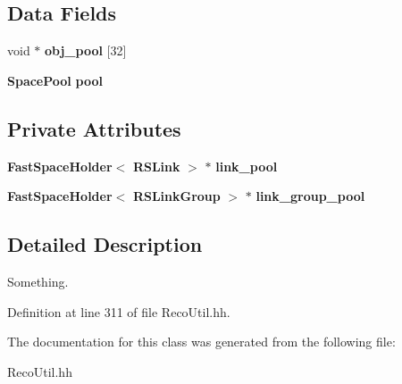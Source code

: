 \subsection*{Data Fields}
\begin{DoxyCompactItemize}
\item 
void $\ast$ {\bfseries obj\_\-pool} [32]\label{classRS_aff4e259ae5012e7916f8e52f6755b413}

\item 
{\bf SpacePool} {\bfseries pool}\label{classRS_ac985cded70310952e9b69aa86e0d6525}

\end{DoxyCompactItemize}
\subsection*{Private Attributes}
\begin{DoxyCompactItemize}
\item 
{\bf FastSpaceHolder}$<$ {\bf RSLink} $>$ $\ast$ {\bfseries link\_\-pool}\label{classRS_a4fc74f14d80ae96f630d0be93ff418aa}

\item 
{\bf FastSpaceHolder}$<$ {\bf RSLinkGroup} $>$ $\ast$ {\bfseries link\_\-group\_\-pool}\label{classRS_a34c8f9118059702b3a88b53e4ddfe5d6}

\end{DoxyCompactItemize}


\subsection{Detailed Description}
Something. 

Definition at line 311 of file RecoUtil.hh.

The documentation for this class was generated from the following file:\begin{DoxyCompactItemize}
\item 
RecoUtil.hh\end{DoxyCompactItemize}
